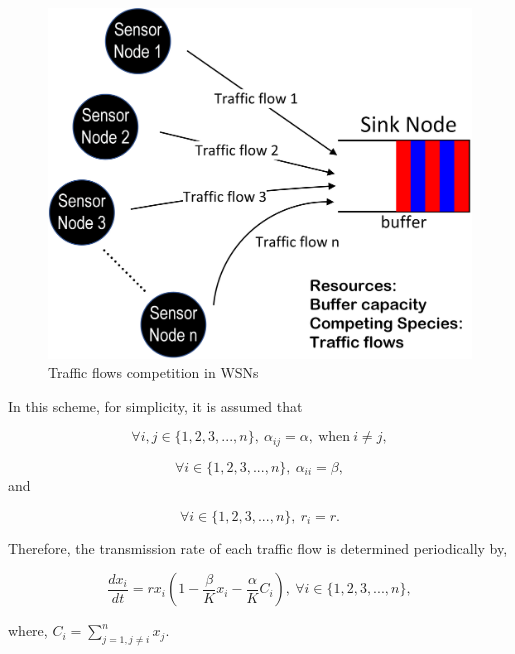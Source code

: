 \begin{figure}
	\centering
	\includegraphics[width=1\linewidth]{pics/letter.png}
	\caption{Traffic flows competition in WSNs}
	\label{fig:letter}
\end{figure}



In this scheme, for simplicity, it is assumed that 

\begin{equation}
\label{assume2}
\forall i,j \in \{1,2,3,...,n\},~\alpha_{ij}=\alpha,~\text{when}~i \neq j,
\end{equation}

\begin{equation}
\label{assume3}
\forall i \in \{1,2,3,...,n\},~\alpha_{ii}=\beta,
\end{equation}
and

\begin{equation}
\label{assume4}
\forall i \in \{1,2,3,...,n\},~r_{i}=r.
\end{equation}




Therefore, the transmission rate of each traffic flow is determined periodically by,

\begin{equation}
\label{jaran}
\frac{dx_i}{dt}=rx_i(1-\frac{\beta}{K}x_i-\frac{\alpha}{K}C_i),~\forall i \in \{1,2,3,...,n\},
\end{equation}

where, $C_i = \sum_{j=1, j\neq i}^{n} x_j$.

